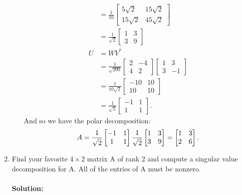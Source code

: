 \documentclass{article}
\begin{document}
\begin{enumerate}
\begin{enumerate}[label= (\alph*)]
\begin{align*}
           &= \frac{1}{10}\begin{bmatrix} 5\sqrt{2} &15\sqrt{2}\\ 15\sqrt{2} &45\sqrt{2} \end{bmatrix}  \\
           &= \frac{1}{\sqrt{2} }\begin{bmatrix} 1&3\\ 3&9\end{bmatrix}  \\
        U&=WV^* \\
         &=\frac{1}{\sqrt{200} }\begin{bmatrix} 2&-4 \\4 &2 \end{bmatrix} \begin{bmatrix} 1&3\\3&-1 \end{bmatrix} \\
         &= \frac{1}{10\sqrt{2} } \begin{bmatrix} -10& 10\\10&10 \end{bmatrix} \\
         &= \frac{1}{\sqrt{2} } \begin{bmatrix} -1& 1\\1&1 \end{bmatrix}
    .\end{align*}
    And so we have the polar decomposition:
    \[
        A=\frac{1}{\sqrt{2} } \begin{bmatrix} -1& 1\\1&1 \end{bmatrix}\frac{1}{\sqrt{2} }\begin{bmatrix} 1&3\\ 3&9\end{bmatrix} =\begin{bmatrix} 1&3\\2&6 \end{bmatrix}  \\
    .\] 
\end{enumerate}

\item Find your favorite $4 \times  2$ matrix A of rank 2 and compute a singular value decomposition for A. All of the entries of A must be nonzero.

    \paragraph{Solution: }


\end{enumerate}
\end{document}
